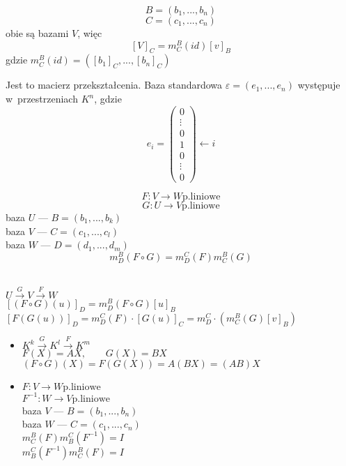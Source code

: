 \begin{wn}
\begin{wn}
    \[ B = (b_1, ..., b_n) \]
    \[ C = (c_1, ..., c_n) \]
    obie są bazami $V$, więc
    \[ [V]_C = m^B_C(id)[v]_B \]
    gdzie $m^B_C(id)=([b_1]_C, ..., [b_n]_C)$
    
    Jest to macierz przekształcenia.
    Baza standardowa $\varepsilon=(e_1, ..., e_n)$ występuje
    w~przestrzeniach $K^n$, gdzie
    \[e_i=\begin{pmatrix}0 \\ \vdots \\ 0 \\ 1 \\ 0 \\ \vdots \\ 0\end{pmatrix} \leftarrow i\]
\end{wn}

\begin{tw}
    \[ F: V \rightarrow W \mathrm{p. liniowe} \]
    \[ G: U \rightarrow V \mathrm{p. liniowe} \]
    baza $U$ --- $B=(b_1, ..., b_k)$ \\
    baza $V$ --- $C=(c_1, ..., c_l)$ \\
    baza $W$ --- $D=(d_1, ..., d_m)$ 
    \[m^B_D(F\circ G)=m^C_D(F)m^B_C(G)\]
\end{tw}

\begin{dd} 
    ~\\
    $U \overset{G}{\longrightarrow}  V \overset{F}{\longrightarrow} W$ \\ 
    $[(F\circ G)(u)]_D = m_D^B(F\circ G)[u]_B$ \\
    $[F(G(u))]_D = m_D^C(F) \cdot [G(u)]_C = m_D^C \cdot (m_C^B(G)[v]_B)$
\end{dd}

\begin{wn} \hfill
    \begin{itemize}
        \item $K^k \overset{G}{\longrightarrow} K^l \overset{F}{\longrightarrow} K^m $\\
              $ F(X) = AX, \qquad G(X) = BX $ \\ 
              $(F\circ G)(X) = F(G(X)) = A(BX) = (AB)X$
        \item $ F: V \rightarrow W \mathrm{ p.liniowe} $ \\
              $ F^{-1}: W \rightarrow V \mathrm{ p. liniowe} $ \\
              baza $V$ --- $B=(b_1, ..., b_n)$ \\
              baza $W$ --- $C=(c_1, ..., c_n)$ \\
              $m^B_C(F)m^C_B(F^{-1}) = I $ \\
              $m^C_B(F^{-1})m^B_C(F) = I $
    \end{itemize}
\end{wn}


\end{wn}
